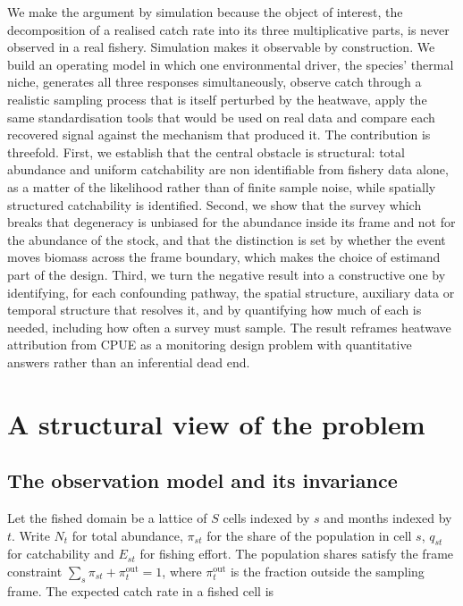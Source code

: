 \documentclass[
  11pt,
  a4paper,
]{article}
\begin{document}
We make the argument by simulation because the object of interest, the
decomposition of a realised catch rate into its three multiplicative
parts, is never observed in a real fishery. Simulation makes it
observable by construction. We build an operating model in which one
environmental driver, the species' thermal niche, generates all three
responses simultaneously, observe catch through a realistic sampling
process that is itself perturbed by the heatwave, apply the same
standardisation tools that would be used on real data and compare each
recovered signal against the mechanism that produced it. The
contribution is threefold. First, we establish that the central obstacle
is structural: total abundance and uniform catchability are non
identifiable from fishery data alone, as a matter of the likelihood
rather than of finite sample noise, while spatially structured
catchability is identified. Second, we show that the survey which breaks
that degeneracy is unbiased for the abundance inside its frame and not
for the abundance of the stock, and that the distinction is set by
whether the event moves biomass across the frame boundary, which makes
the choice of estimand part of the design. Third, we turn the negative
result into a constructive one by identifying, for each confounding
pathway, the spatial structure, auxiliary data or temporal structure
that resolves it, and by quantifying how much of each is needed,
including how often a survey must sample. The result reframes heatwave
attribution from CPUE as a monitoring design problem with quantitative
answers rather than an inferential dead end.

\hypertarget{a-structural-view-of-the-problem}{%
\section{A structural view of the
problem}\label{a-structural-view-of-the-problem}}

\hypertarget{the-observation-model-and-its-invariance}{%
\subsection{The observation model and its
invariance}\label{the-observation-model-and-its-invariance}}

Let the fished domain be a lattice of \(S\) cells indexed by \(s\) and
months indexed by \(t\). Write \(N_t\) for total abundance, \(\pi_{st}\)
for the share of the population in cell \(s\), \(q_{st}\) for
catchability and \(E_{st}\) for fishing effort. The population shares
satisfy the frame constraint
\(\sum_s \pi_{st} + \pi^{\text{out}}_t = 1\), where
\(\pi^{\text{out}}_t\) is the fraction outside the sampling frame. The
expected catch rate in a fished cell is
\end{document}
